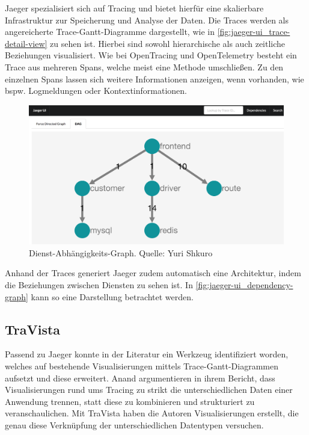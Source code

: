 Jaeger spezialisiert sich auf Tracing und bietet hierfür eine skalierbare Infrastruktur zur Speicherung und Analyse der Daten. Die Traces werden als angereicherte Trace-Gantt-Diagramme dargestellt, wie in \autoref{fig:jaeger-ui_trace-detail-view} zu sehen ist. Hierbei sind sowohl hierarchische als auch zeitliche Beziehungen visualisiert. Wie bei OpenTracing und OpenTelemetry besteht ein Trace aus mehreren Spans, welche meist eine Methode umschließen. Zu den einzelnen Spans lassen sich weitere Informationen anzeigen, wenn vorhanden, wie bspw. Logmeldungen oder Kontextinformationen.

\begin{figure}
\centering
\includegraphics[width=\linewidth]{img/03_methoden/medium_jaeger-ui_dependency-graph.png}
\caption{Dienst-Abhängigkeits-Graph. Quelle: Yuri Shkuro \cite{JaegerTakeOpenTracingForARide}}
\label{fig:jaeger-ui_dependency-graph}
\end{figure}

Anhand der Traces generiert Jaeger zudem automatisch eine Architektur, indem die Beziehungen zwischen Diensten zu sehen ist. In \autoref{fig:jaeger-ui_dependency-graph} kann so eine Darstellung betrachtet werden.

\subsection{TraVista}

Passend zu Jaeger konnte in der Literatur ein Werkzeug identifiziert worden, welches auf bestehende Visualisierungen mittels Trace-Gantt-Diagrammen aufsetzt und diese erweitert. Anand \etal \cite{TraVistaPaper} argumentieren in ihrem Bericht, dass Visualisierungen rund ums Tracing zu strikt die unterschiedlichen Daten einer Anwendung trennen, statt diese zu kombinieren und strukturiert zu veranschaulichen. Mit TraVista haben die Autoren Visualisierungen erstellt, die genau diese Verknüpfung der unterschiedlichen Datentypen versuchen.

